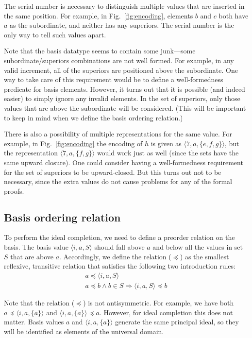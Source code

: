 \documentclass{llncs}
\begin{document}
The serial number is necessary to distinguish multiple values that are
inserted in the same position.  For example, in
Fig.~\ref{fig:encoding}, elements $b$ and $c$ both have $a$ as the
subordinate, and neither has any superiors.  The serial number is the
only way to tell such values apart.

Note that the basis datatype seems to contain some junk---some
subordinate/superiors combinations are not well formed.  For example, in
any valid increment, all of the superiors are positioned above the
subordinate.  One way to take care of this requirement would be to
define a well-formedness predicate for basis elements.  However, it
turns out that it is possible (and indeed easier) to simply ignore any
invalid elements.  In the set of superiors, only those values that are
above the subordinate will be considered.  (This will be important to
keep in mind when we define the basis ordering relation.)

There is also a possibility of multiple representations for the same
value.  For example, in Fig.~\ref{fig:encoding} the encoding of $h$ is
given as $\langle 7, a, \{e,f,g\} \rangle$, but the representation
$\langle 7, a, \{f,g\} \rangle$ would work just as well (since the
sets have the same upward closure).  One could consider having a
well-formedness requirement for the set of superiors to be
upward-closed.  But this turns out not to be necessary, since the
extra values do not cause problems for any of the formal proofs.

\subsection{Basis ordering relation}

To perform the ideal completion, we need to define a preorder relation
on the basis.  The basis value $\langle i, a, S \rangle$ should fall
above $a$ and below all the values in set $S$ that are above $a$.
Accordingly, we define the relation ($\preceq$) as the smallest
reflexive, transitive relation that satisfies the following two
introduction rules:
\begin{align}
\label{eq:preceq-1}
a \preceq \langle i, a, S \rangle \\
\label{eq:preceq-2}
a \preceq b \wedge b \in S \Longrightarrow
  \langle i, a, S \rangle \preceq b
\end{align}

Note that the relation ($\preceq$) is not antisymmetric.  For example,
we have both $a \preceq \langle i, a, \{a\} \rangle$ and $\langle i,
a, \{a\} \rangle \preceq a$.  However, for ideal completion this does
not matter.  Basis values $a$ and $\langle i, a, \{a\} \rangle$
generate the same principal ideal, so they will be identified as
elements of the universal domain.
\end{document}
